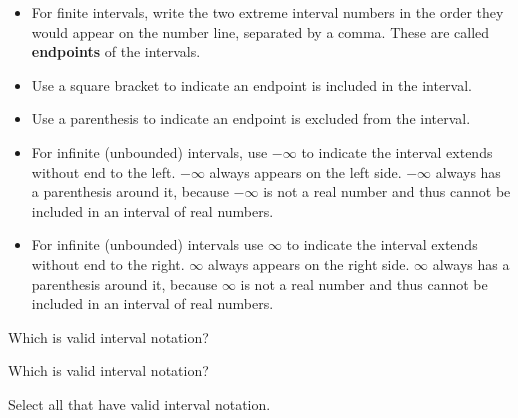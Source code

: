 \documentclass{ximera}
\begin{document}
\begin{itemize}
\item For finite intervals, write the two extreme interval numbers in the order they would appear on the number line, separated by a comma.  These are called \textbf{endpoints} of the intervals.
\item Use a square bracket to indicate an endpoint is included in the interval.
\item Use a parenthesis to indicate an endpoint is excluded from the interval.
\item For infinite (unbounded) intervals, use $-\infty$ to indicate the interval extends without end to the left. $-\infty$ always appears on the left side. $-\infty$ always has a parenthesis around it, because $-\infty$ is not a real number and thus cannot be included in an interval of real numbers.
\item For infinite (unbounded) intervals use $\infty$ to indicate the interval extends without end to the right. $\infty$ always appears on the right side. $\infty$ always has a parenthesis around it, because $\infty$ is not a real number and thus cannot be included in an interval of real numbers. 
\end{itemize}


\begin{question} 


Which is valid interval notation?
	\begin{multipleChoice}
	\choice {$[3, -2)$}
	\choice [correct]{$[-2, 3)$}
	\end{multipleChoice}
\end{question}



\begin{question}


Which is valid interval notation?
	\begin{multipleChoice}
	\choice {$[1, \infty]$}
	\choice [correct]{$[1, \infty)$}
	\end{multipleChoice}
\end{question}



\begin{question}


Select all that have valid interval notation.
	\begin{selectAll}
	\choice {$[-3, -5]$}
	\choice [correct]{$[1, 8)$}
	\choice [correct]{$(-\infty, -4]$}
	\choice {$[-\infty, 7)$}
	\choice [correct]{$(-1, 2]$}
	\choice {$[6, 2]$}
	\end{selectAll}
\end{question}
\end{document}

